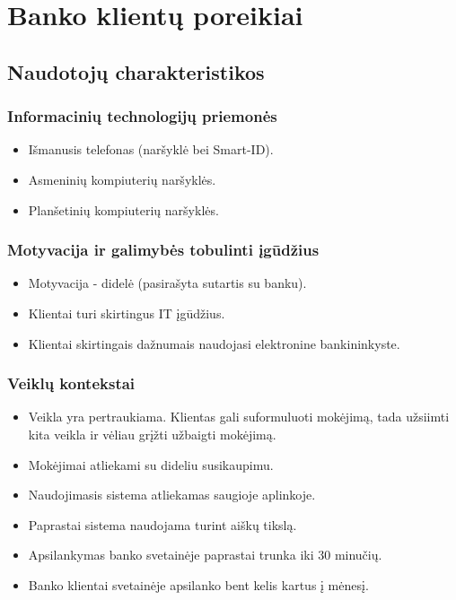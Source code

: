 \documentclass{VUMIFPSkursinis}
\begin{document}
\section{Banko klientų poreikiai}
\subsection{Naudotojų charakteristikos}
\subsubsection{Informacinių technologijų priemonės}
\begin{itemize}
	\item Išmanusis telefonas (naršyklė bei Smart-ID).
	\item Asmeninių kompiuterių naršyklės.
	\item Planšetinių kompiuterių naršyklės.
\end{itemize}
\subsubsection{Motyvacija ir galimybės tobulinti įgūdžius}
\begin{itemize}
	\item Motyvacija - didelė (pasirašyta sutartis su banku).
	\item Klientai turi skirtingus IT įgūdžius.
	\item Klientai skirtingais dažnumais naudojasi elektronine bankininkyste.
\end{itemize}
\subsubsection{Veiklų kontekstai}
\begin{itemize}
	\item Veikla yra pertraukiama. Klientas gali suformuluoti mokėjimą, tada užsiimti kita veikla ir vėliau grįžti užbaigti mokėjimą.
	\item Mokėjimai atliekami su dideliu susikaupimu.
	\item Naudojimasis sistema atliekamas saugioje aplinkoje.
	\item Paprastai sistema naudojama turint aiškų tikslą.
	\item Apsilankymas banko svetainėje paprastai trunka iki 30 minučių.
	\item Banko klientai svetainėje apsilanko bent kelis kartus į mėnesį.
\end{itemize}
\end{document}
